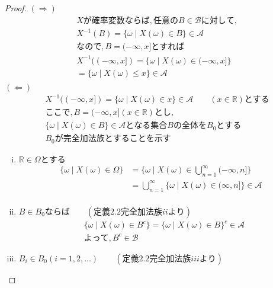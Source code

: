 \documentclass[dvipdfmx,10pt, a4j]{jarticle}
\theoremstyle{definition}
\begin{document}
    \begin{proof}
        $(\Rightarrow)$\\
        \begin{align*}
            &Xが確率変数ならば,任意のB \in \mathcal{B} に対して,\\
            &X^{-1}(B) = \{\omega \mid X(\omega) \in B\} \in \mathcal{A}\\
            &なので, B = (- \infty, x] とすれば\\
            &X^{-1}((- \infty, x]) = \{\omega \mid X(\omega) \in (- \infty, x]\}\\
            &= \{\omega \mid X(\omega) \leq x\} \in \mathcal{A}\\
        \end{align*}
        $(\Leftarrow)$\\
        \begin{align*}
            &X^{-1}((- \infty, x]) = \{\omega \mid X(\omega) \in x\} \in \mathcal{A} \qquad (x \in \mathbb{R}) とする\\
            &ここで, B = (- \infty, x](x \in \mathbb{R}) とし,\\
            &\{\omega \mid X(\omega) \in B \} \in \mathcal{A} となる集合Bの全体をB_0とする\\
            &B_0 が完全加法族とすることを示す
        \end{align*}
        \begin{enumerate}[i)]
            \item $\mathbb{R} \in \Omega とする$\\
            \begin{align*}
                \{\omega \mid X(\omega) \in \Omega\} &= \{\omega \mid X(\omega) \in \bigcup_{n=1}^{\infty}{(- \infty, n]}\}\\
                &= \bigcup_{n=1}^{\infty}{\{\omega \mid X(\omega) \in (\infty, n]\}} \in \mathcal{A}\\
            \end{align*}
            \item $B \in B_0 ならば \qquad (定義2.2 完全加法族 ii より)$
            \begin{align*}
                &\{\omega \mid X(\omega) \in B^{c}\} = \{\omega \mid X(\omega) \in B\}^{c} \in \mathcal{A}\\
                &よって, B^{c} \in \mathcal{B}
            \end{align*}
            \item $B_i \in B_0 (i = 1,2, \dots) \qquad (定義2.2 完全加法族 iii より)$

\end{enumerate}
\end{proof}
\end{document}
